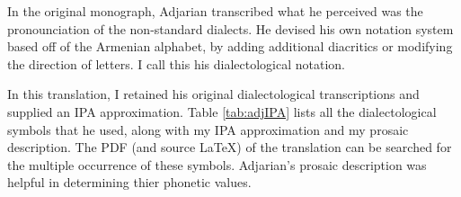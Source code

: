 In the original monograph, Adjarian transcribed what he perceived was the pronounciation of the non-standard dialects. He devised his own notation system based off of the Armenian alphabet, by adding additional diacritics or modifying the direction of letters. I call this his dialectological notation. 

In this translation, I retained his original dialectological transcriptions and supplied  an IPA approximation. Table \ref{tab:adjIPA}  lists all the dialectological symbols that he used, along with my IPA approximation and my  prosaic description. The PDF (and source LaTeX) of the translation can be searched for the multiple occurrence of these symbols. Adjarian's prosaic description was  helpful in determining thier phonetic values.  



